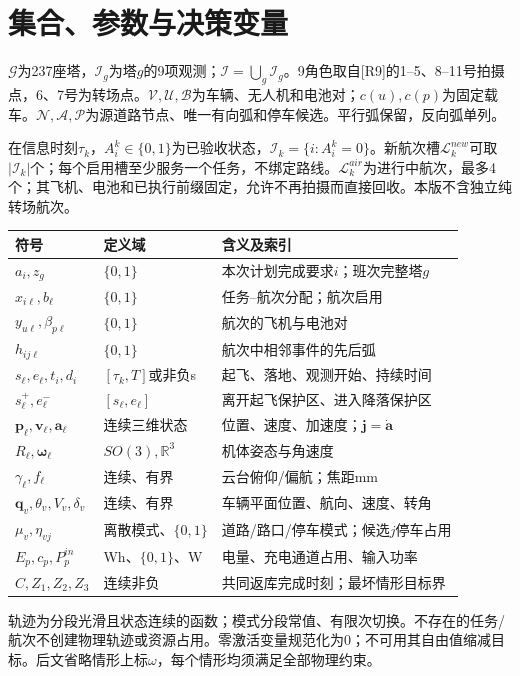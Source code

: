 \section{集合、参数与决策变量}
\noindent $\mathcal G$为237座塔，$\mathcal I_g$为塔$g$的9项观测；$\mathcal I=\bigcup_g\mathcal I_g$。9角色取自[R9]的1--5、8--11号拍摄点，6、7号为转场点。$\mathcal V,\mathcal U,\mathcal B$为车辆、无人机和电池对；$c(u),c(p)$为固定载车。$\mathcal N,\mathcal A,\mathcal P$为源道路节点、唯一有向弧和停车候选。平行弧保留，反向弧单列。

\noindent 在信息时刻$\tau_k$，$A_i^k\in\{0,1\}$为已验收状态，$\mathcal I_k=\{i:A_i^k=0\}$。新航次槽$\mathcal L_k^{new}$可取$|\mathcal I_k|$个；每个启用槽至少服务一个任务，不绑定路线。$\mathcal L_k^{air}$为进行中航次，最多4个；其飞机、电池和已执行前缀固定，允许不再拍摄而直接回收。本版不含独立纯转场航次。
\begin{center}\small
\begin{tabular}{p{.24\linewidth}p{.25\linewidth}p{.41\linewidth}}\toprule
符号 & 定义域 & 含义及索引\\\midrule
$a_i,z_g$ & $\{0,1\}$ & 本次计划完成要求$i$；班次完整塔$g$\\
$x_{i\ell},b_\ell$ & $\{0,1\}$ & 任务--航次分配；航次启用\\
$y_{u\ell},\beta_{p\ell}$ & $\{0,1\}$ & 航次的飞机与电池对\\
$h_{ij\ell}$ & $\{0,1\}$ & 航次中相邻事件的先后弧\\
$s_\ell,e_\ell,t_i,d_i$ & $[\tau_k,T]$或非负s & 起飞、落地、观测开始、持续时间\\
$s_\ell^+,e_\ell^-$ & $[s_\ell,e_\ell]$ & 离开起飞保护区、进入降落保护区\\
$\mathbf p_\ell,\mathbf v_\ell,\mathbf a_\ell$ & 连续三维状态 & 位置、速度、加速度；$\mathbf j=\dot{\mathbf a}$\\
$R_\ell,\boldsymbol\omega_\ell$ & $SO(3),\mathbb R^3$ & 机体姿态与角速度\\
$\gamma_\ell,f_\ell$ & 连续、有界 & 云台俯仰/偏航；焦距mm\\
$\mathbf q_v,\theta_v,V_v,\delta_v$ & 连续、有界 & 车辆平面位置、航向、速度、转角\\
$\mu_v,\eta_{vj}$ & 离散模式、$\{0,1\}$ & 道路/路口/停车模式；候选$j$停车占用\\
$E_p,c_p,P_p^{in}$ & Wh、$\{0,1\}$、W & 电量、充电通道占用、输入功率\\
$C,Z_1,Z_2,Z_3$ & 连续非负 & 共同返库完成时刻；最坏情形目标界\\\bottomrule
\end{tabular}\end{center}
\noindent 轨迹为分段光滑且状态连续的函数；模式分段常值、有限次切换。不存在的任务/航次不创建物理轨迹或资源占用。零激活变量规范化为0；不可用其自由值缩减目标。后文省略情形上标$\omega$，每个情形均须满足全部物理约束。
\clearpage

